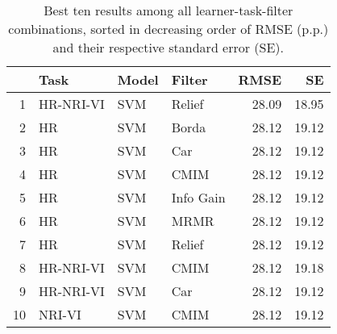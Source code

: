 \begin{table}[ht!]
\centering
\caption{Best ten results among all learner-task-filter combinations, sorted in decreasing order of RMSE (p.p.) and their respective standard error (SE).} 
\label{tab:perf-top-10}
\begin{tabular}{rlllrr}
  \hline
 & Task & Model & Filter & RMSE & SE \\ 
  \hline
1 & HR-NRI-VI & SVM & Relief & 28.09 & 18.95 \\ 
  2 & HR & SVM & Borda & 28.12 & 19.12 \\ 
  3 & HR & SVM & Car & 28.12 & 19.12 \\ 
  4 & HR & SVM & CMIM & 28.12 & 19.12 \\ 
  5 & HR & SVM & Info Gain & 28.12 & 19.12 \\ 
  6 & HR & SVM & MRMR & 28.12 & 19.12 \\ 
  7 & HR & SVM & Relief & 28.12 & 19.12 \\ 
  8 & HR-NRI-VI & SVM & CMIM & 28.12 & 19.18 \\ 
  9 & HR-NRI-VI & SVM & Car & 28.12 & 19.12 \\ 
  10 & NRI-VI & SVM & CMIM & 28.12 & 19.12 \\ 
   \hline
\end{tabular}
\end{table}
